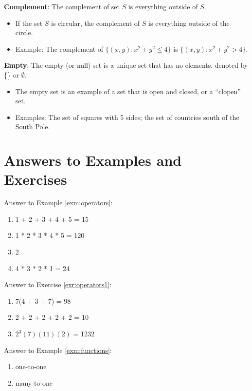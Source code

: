 \documentclass[]{book}
\providecommand{\tightlist}{%
  \setlength{\itemsep}{0pt}\setlength{\parskip}{0pt}}
\theoremstyle{definition}
\theoremstyle{definition}
\theoremstyle{definition}
\theoremstyle{remark}
\begin{document}
\textbf{Complement}: The complement of set \(S\) is everything outside
of \(S\).

\begin{itemize}
\tightlist
\item
  If the set \(S\) is circular, the complement of \(S\) is everything
  outside of the circle.
\item
  Example: The complement of \(\{ (x,y) : x^2+y^2\le 4 \}\) is
  \(\{ (x,y) : x^2+y^2 > 4 \}\).
\end{itemize}

\textbf{Empty}: The empty (or null) set is a unique set that has no
elements, denoted by \{\} or \(\emptyset\).

\begin{itemize}
\tightlist
\item
  The empty set is an example of a set that is open and closed, or a
  ``clopen'' set.
\item
  Examples: The set of squares with 5 sides; the set of countries south
  of the South Pole.
\end{itemize}

\section*{Answers to Examples and
Exercises}\label{answers-to-examples-and-exercises-1}

Answer to Example \ref{exm:operators}:

\begin{enumerate}
\def\labelenumi{\arabic{enumi}.}
\item
  1 + 2 + 3 + 4 + 5 = 15
\item
  1 * 2 * 3 * 4 * 5 = 120
\item
  2
\item
  4 * 3 * 2 * 1 = 24
\end{enumerate}

Answer to Exercise \ref{exr:operators1}:

\begin{enumerate}
\def\labelenumi{\arabic{enumi}.}
\item
  7(4 + 3 + 7) = 98
\item
  2 + 2 + 2 + 2 + 2 = 10
\item
  \(2^3(7)(11)(2)\) = 1232
\end{enumerate}

Answer to Example \ref{exm:functions}:

\begin{enumerate}
\def\labelenumi{\arabic{enumi}.}
\item
  one-to-one
\item
  many-to-one
\end{enumerate}
\end{document}

